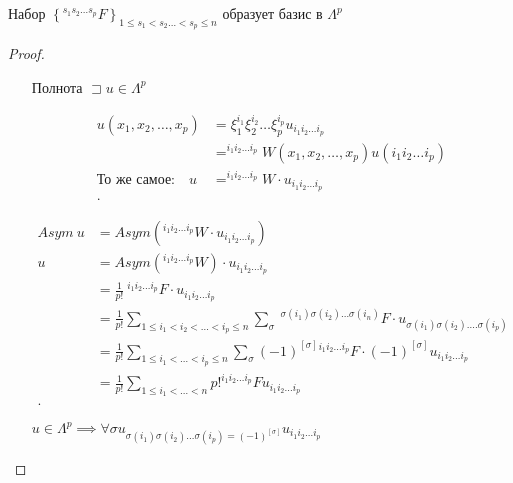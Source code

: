 \documentclass{book}
\theoremstyle{definition}
\begin{document}
 \begin{theorem}
     Набор $\left\{ ^{s_1 s_2 \ldots s_p}F \right\} _{1\leqslant s_1 < s_2 \ldots < s_p\leqslant  n}$ образует базис в $\Lambda^p$
 \end{theorem}
 \begin{proof}
     \begin{itemize}
         \item []
         \item [Полнота]
             $\sqsupset u\in \Lambda^p$

             \begin{align*}
                 u\left( x_1, x_2, \ldots, x_p \right) &= \xi_1^{i_1}\xi_2^{i_2}\ldots\xi_p^{i_p}u_{i_1 i_2 \ldots i_p} \\
                                                       &= ^{i_1 i_2 \ldots i_p}W\left( x_1, x_2, \ldots, x_p \right) u\left( i_1 i_2 \ldots i_p \right)  \\
                 \text{То же самое:}\quad u &= ^{i_1 i_2 \ldots i_p}W\cdot u_{i_1 i_2 \ldots i_p} \\
             .\end{align*}

             \begin{align*}
                 Asym ~ u &= Asym \left( ^{i_1 i_2 \ldots i_p}W\cdot u_{i_1 i_2 \ldots i_p} \right)  \\
                 u &= Asym\left( ^{i_1 i_2 \ldots i_p} W \right)\cdot u_{i_1 i_2 \ldots i_p}  \\
                   &= \frac{1}{p!} ~ ^{i_1 i_2 \ldots i_p}F\cdot u_{i_1 i_2 \ldots i_p} \\
                   &= \frac{1}{p!}\sum_{1\leqslant  i_1 < i_2 < \ldots < i_p \leqslant  n}\sum_{\sigma}~ ^{\sigma(i_1)\sigma(i_2) \ldots \sigma(i_n)}F \cdot u_{\sigma(i_1)\sigma(i_2) \ldots. \sigma(i_p)} \\
                   &= \frac{1}{p!}\sum_{1\leqslant i_1 < \ldots < i_p \leqslant n} \sum_{\sigma} (-1)^{[\sigma]} {}^{i_1 i_2 \ldots i_p} F \cdot  (-1)^{[\sigma]}u_{i_1 i_2 \ldots i_p} \\
                   &= \frac{1}{p!} \sum_{1 \leqslant  i_1 < \ldots < n} p! ^{i_1 i_2 \ldots i_p}F u_{i_1 i_2 \ldots i_p}\\
             .\end{align*}

             \begin{lemma}
                 $u\in \Lambda ^p \implies  \forall \sigma u_{\sigma(i_1)\sigma(i_2) \ldots \sigma(i_p) = (-1)^{[\sigma]}}u_{i_1 i_2 \ldots i_p}$


\end{lemma}
\end{itemize}
\end{proof}
\end{document}
